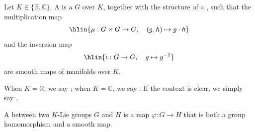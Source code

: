 \begin{definition} \label{definition:lie_group_over_a_field}

    Let $K \in \{\mathbb{R}, \mathbb{C}\}$. A  is a  $G$ over $K$, together with the structure of a , such that the multiplication map
    $$\hlin{\mu : G \times G \to G, \quad (g, h) \mapsto g \cdot h}$$
    and the inversion map
    $$\hlin{\iota : G \to G, \quad g \mapsto g^{-1}}$$
    are smooth maps of manifolds over $K$.

    When $K = \mathbb{R}$, we say ; when $K = \mathbb{C}$, we say . If the context is clear, we simply say .

    A  between two $K$-Lie groups $G$ and $H$ is a map $\varphi : G \to H$ that is both a group homomorphism and a smooth map.
\end{definition}
